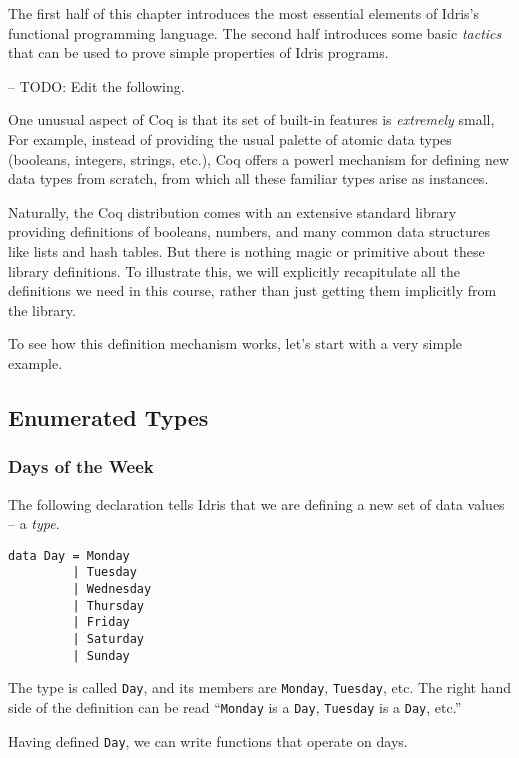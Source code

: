 The first half of this chapter introduces the most essential elements of
Idris's functional programming language. The second half introduces some
basic \emph{tactics} that can be used to prove simple properties of
Idris programs.

-- TODO: Edit the following.

One unusual aspect of Coq is that its set of built-in features is
\emph{extremely} small, For example, instead of providing the usual
palette of atomic data types (booleans, integers, strings, etc.), Coq
offers a powerl mechanism for defining new data types from scratch, from
which all these familiar types arise as instances.

Naturally, the Coq distribution comes with an extensive standard library
providing definitions of booleans, numbers, and many common data
structures like lists and hash tables. But there is nothing magic or
primitive about these library definitions. To illustrate this, we will
explicitly recapitulate all the definitions we need in this course,
rather than just getting them implicitly from the library.

To see how this definition mechanism works, let's start with a very
simple example.

\subsection{Enumerated Types}\label{enumerated-types}

\subsubsection{Days of the Week}\label{days-of-the-week}

The following declaration tells Idris that we are defining a new set of
data values -- a \emph{type}.

\begin{verbatim}
data Day = Monday
         | Tuesday
         | Wednesday
         | Thursday
         | Friday
         | Saturday
         | Sunday
\end{verbatim}

The type is called \texttt{Day}, and its members are
\texttt{Monday}, \texttt{Tuesday}, etc. The
right hand side of the definition can be read
``\texttt{Monday} is a \texttt{Day},
\texttt{Tuesday} is a \texttt{Day}, etc.''

Having defined \texttt{Day}, we can write functions that
operate on days.

